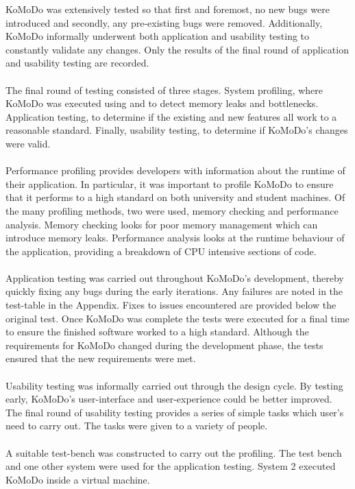 KoMoDo was extensively tested so that first and foremost, no new bugs were introduced and secondly, any pre-existing bugs were removed. Additionally, KoMoDo informally underwent both application and usability testing to constantly validate any changes. Only the results of the final round of application and usability testing are recorded.\\\\
%
The final round of testing consisted of three stages. System profiling, where KoMoDo was executed using  and  to detect memory leaks and bottlenecks. Application testing, to determine if the existing and new features all work to a reasonable standard. Finally, usability testing, to determine if KoMoDo's changes were valid.\\\\
%
Performance profiling provides developers with information about the runtime of their application. In particular, it was important to profile KoMoDo to ensure that it performs to a high standard on both university and student machines. Of the many profiling methods, two were used, memory checking and performance analysis. Memory checking looks for poor memory management which can introduce memory leaks. Performance analysis looks at the runtime behaviour of the application, providing a breakdown of CPU intensive sections of code.\\\\
%
Application testing was carried out throughout KoMoDo's development, thereby quickly fixing any bugs during the early iterations. Any failures are noted in the test-table in the Appendix. Fixes to issues encountered are provided below the original test. Once KoMoDo was complete the tests were executed for a final time to ensure the finished software worked to a high standard. Although the requirements for KoMoDo changed during the development phase, the tests ensured that the new requirements were met.\\\\
%
Usability testing was informally carried out through the design cycle. By testing early, KoMoDo's user-interface and user-experience could be better improved. The final round of usability testing provides a series of simple tasks which user's need to carry out. The tasks were given to a variety of people.\\\\
%
A suitable test-bench was constructed to carry out the profiling. The test bench and one other system were used for the application testing. System 2 executed KoMoDo inside a virtual machine.\\\\
